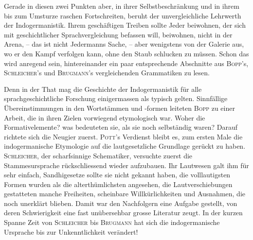 {\largerpage[-1]Gerade in diesen zwei Punkten aber, in ihrer Selbstbeschränkung und in ihrem bis zum Umsturze raschen Fortschreiten, beruht der unvergleichliche Lehrwerth der Indogermanistik. Ihrem geschäftigen Treiben sollte Jeder beiwohnen, der sich mit geschichtlicher Sprachvergleichung befassen will, beiwohnen, nicht in der Arena, – das ist nicht Jedermanns Sache, – aber wenigstens von der Galerie aus, wo er den Kampf verfolgen kann, ohne den Staub schlucken zu müssen. Schon das wird anregend sein, hintereinander ein paar entsprechende Abschnitte aus \textsc{Bopp}’s, \textsc{Schleicher}’s und \textsc{Brugmann}’s vergleichenden Grammatiken zu lesen.

Denn in der That mag die Geschichte der Indogermanistik für alle sprachgeschichtliche Forschung einigermassen als typisch gelten. Sinnfällige Übereinstimmungen in den Wortstämmen und -formen leiteten \textsc{Bopp} zu einer Arbeit, die in ihren Zielen vorwiegend etymologisch war. Woher die Formativelemente? was bedeuteten sie, als sie noch selbständig waren? Darauf richtete sich die Neugier zuerst. \textsc{Pott}’s Verdienst bleibt \label{fp.182} es, zum ersten Male die indogermanische Etymologie auf die lautgesetzliche Grundlage gerückt zu haben. \textsc{Schleicher}, der scharfsinnige Schematiker, versuchte zuerst die Stammesursprache rückschliessend wieder aufzubauen. Ihr Lautwesen galt ihm für sehr einfach, Sandhigesetze sollte sie nicht gekannt haben, die volllautigsten Formen wurden als die alter\-thümlichsten angesehen, die Lautverschiebungen gestatteten manche Freiheiten, scheinbare Willkürlichkeiten und Ausnahmen, die noch unerklärt blieben. Damit war den Nachfolgern eine Aufgabe gestellt, von deren Schwierigkeit eine fast unübersehbar grosse Literatur zeugt.  In der kurzen Spanne Zeit von \textsc{Schleicher} bis \textsc{Brugmann} hat sich die indogermanische Ursprache bis zur Unkenntlichkeit verändert! 

}
